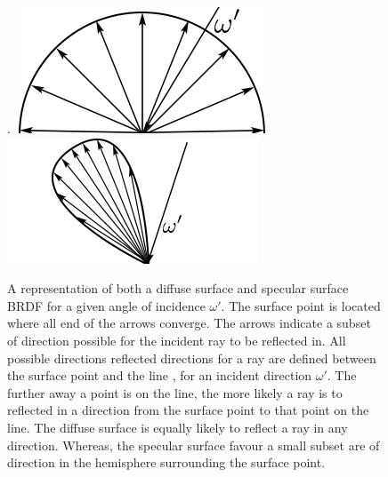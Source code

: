 \documentclass[ %
                    author={Callum Pearce},
                supervisor={Dr. Neill Campbell},
                    degree={MEng},
                     title={How effective are Temporal difference learning methods for reducing the number of zero contribution light paths while still accurately approximating Global Illumination in Path tracing?},
                  subtitle={},
                      type={research},
                      year={2019} ]{dissertation}
\begin{document}
\begin{figure}[!h]
\label{fig:brdfs}
\centering.
  \includegraphics[width=\textwidth]{images/diffuse_brdf.png}   
  \label{fig:diffuse_brdf}
\endminipage\hspace{5em}
  \includegraphics[width=\textwidth]{images/specular_brdf.png}
  \label{fig:specular_brdf}
\endminipage
\caption{A representation of both a diffuse surface and specular surface BRDF for a given angle of incidence $\omega'$. The surface point is located where all end of the arrows converge. The arrows indicate a subset of direction possible for the incident ray to be reflected in. All possible directions reflected directions for a ray are defined between the surface point and the line , for an incident direction $\omega'$. The further away a point is on the line, the more likely a ray is to reflected in a direction from the surface point to that point on the line. The diffuse surface is equally likely to reflect a ray in any direction. Whereas, the specular surface favour a small subset are of direction in the hemisphere surrounding the surface point.}
\end{figure}
\end{document}

